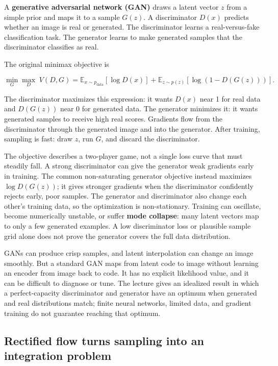 A \textbf{generative adversarial network (GAN)} draws a latent vector \(z\) from a simple prior and maps it to a sample \(G(z)\). A discriminator \(D(x)\) predicts whether an image is real or generated. The discriminator learns a real-versus-fake classification task. The generator learns to make generated samples that the discriminator classifies as real.

The original minimax objective is

\[
\min_G\max_D\;V(D,G)=
\mathbb{E}_{x\sim p_{\text{data}}}[\log D(x)]
+\mathbb{E}_{z\sim p(z)}[\log(1-D(G(z)))].
\]

The discriminator maximizes this expression: it wants \(D(x)\) near 1 for real data and \(D(G(z))\) near 0 for generated data. The generator minimizes it: it wants generated samples to receive high real scores. Gradients flow from the discriminator through the generated image and into the generator. After training, sampling is fast: draw \(z\), run \(G\), and discard the discriminator.

The objective describes a two-player game, not a single loss curve that must steadily fall. A strong discriminator can give the generator weak gradients early in training. The common non-saturating generator objective instead maximizes \(\log D(G(z))\); it gives stronger gradients when the discriminator confidently rejects early, poor samples. The generator and discriminator also change each other's training data, so the optimization is non-stationary. Training can oscillate, become numerically unstable, or suffer \textbf{mode collapse}: many latent vectors map to only a few generated examples. A low discriminator loss or plausible sample grid alone does not prove the generator covers the full data distribution.

GANs can produce crisp samples, and latent interpolation can change an image smoothly. But a standard GAN maps from latent code to image without learning an encoder from image back to code. It has no explicit likelihood value, and it can be difficult to diagnose or tune. The lecture gives an idealized result in which a perfect-capacity discriminator and generator have an optimum when generated and real distributions match; finite neural networks, limited data, and gradient training do not guarantee reaching that optimum.

\subsection{Rectified flow turns sampling into an integration problem}\label{04-visual-computing-ii-ch031-rectified-flow-turns-sampling-into-an-integration-problem}

